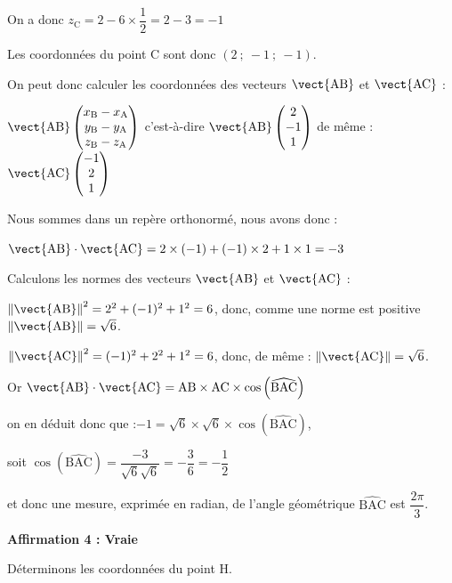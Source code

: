 On a donc $z_{\mathrm{C}}=2- 6\times \dfrac{1}{2}= 2-3=-1$

Les coordonnées du point C sont donc $(2~;~-1~;~-1)$.

On peut donc calculer les coordonnées des vecteurs $\vect{\mathrm{AB}}$ et $\vect{\mathrm{AC}}$ : 

$\vect{\mathrm{AB}}\begin{pmatrix}x_\mathrm{B} -x_\mathrm{A} \\ y_\mathrm{B}-y_\mathrm{A}\\z_\mathrm{B}-z_\mathrm{A}\end{pmatrix}$ c'est-à-dire $\vect{\mathrm{AB}}\begin{pmatrix}2 \\ -1\\1\end{pmatrix}$ 
\quad de même : $\vect{\mathrm{AC}}\begin{pmatrix}-1 \\ 2\\1\end{pmatrix}$

Nous sommes dans un repère orthonormé, nous avons donc :

$\vect {\mathrm{AB}} \cdot \vect {\mathrm{AC}}= 2 \times (-1) + (-1) \times 2 + 1 \times 1 = -3$ 

Calculons les normes des  vecteurs $\vect{\mathrm{AB}}$ et $\vect{\mathrm{AC}}$ :

$\left\|\vect {\mathrm{AB}}\right\|^2=2^2+(-1)^2+1^2=6$, donc, comme une norme est positive $\left\|\vect {\mathrm{AB}}\right\|=\sqrt{6}$.

$\left\|\vect {\mathrm{AC}}\right\|^2=(-1)^2+2^2+1^2=6$, donc, de même :
$\left\|\vect {\mathrm{AC}}\right\|=\sqrt{6}$.

Or $\vect {\mathrm{AB}} \cdot \vect {\mathrm{AC}}=\mathrm{AB} \times \mathrm{AC} \times \cos\left(\widehat{\mathrm{BAC}}\right)$

on en déduit donc que :\quad $-1=\sqrt{6} \times  \sqrt{6} \times \cos \left(\widehat{\mathrm{BAC}}\right)$,

soit \quad$\cos \left(\widehat{\mathrm{BAC}}\right)=\dfrac{-3}{\sqrt{6}\sqrt{6}}=-\dfrac{3}{6}=-\dfrac{1}{2}$

et donc une mesure, exprimée en radian, de l'angle géométrique
$\widehat{\mathrm{BAC}}$ est $\dfrac{2\pi}{3}$.

\bigskip

\textbf{Affirmation 4 : Vraie}

Déterminons les coordonnées du point H.

